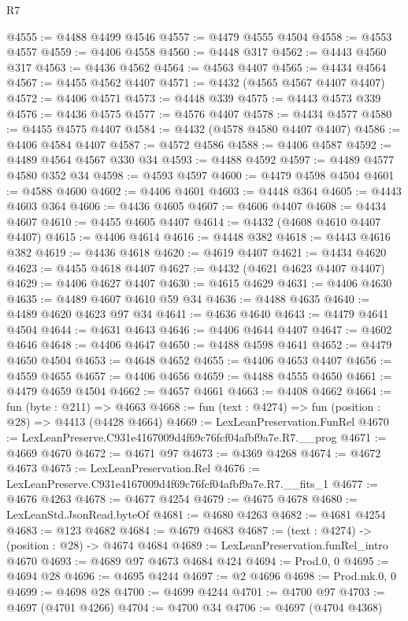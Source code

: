 \begin{lexlean}{R7}
\begin{coremodule}
@4555 := @4488 @4499 @4546
@4557 := @4479 @4555 @4504
@4558 := @4553 @4557
@4559 := @4406 @4558
@4560 := @4448 @317
@4562 := @4443 @4560 @317
@4563 := @4436 @4562
@4564 := @4563 @4407
@4565 := @4434 @4564
@4567 := @4455 @4562 @4407
@4571 := @4432 (@4565 @4567 @4407 @4407)
@4572 := @4406 @4571
@4573 := @4448 @339
@4575 := @4443 @4573 @339
@4576 := @4436 @4575
@4577 := @4576 @4407
@4578 := @4434 @4577
@4580 := @4455 @4575 @4407
@4584 := @4432 (@4578 @4580 @4407 @4407)
@4586 := @4406 @4584 @4407
@4587 := @4572 @4586
@4588 := @4406 @4587
@4592 := @4489 @4564 @4567 @330 @34
@4593 := @4488 @4592
@4597 := @4489 @4577 @4580 @352 @34
@4598 := @4593 @4597
@4600 := @4479 @4598 @4504
@4601 := @4588 @4600
@4602 := @4406 @4601
@4603 := @4448 @364
@4605 := @4443 @4603 @364
@4606 := @4436 @4605
@4607 := @4606 @4407
@4608 := @4434 @4607
@4610 := @4455 @4605 @4407
@4614 := @4432 (@4608 @4610 @4407 @4407)
@4615 := @4406 @4614
@4616 := @4448 @382
@4618 := @4443 @4616 @382
@4619 := @4436 @4618
@4620 := @4619 @4407
@4621 := @4434 @4620
@4623 := @4455 @4618 @4407
@4627 := @4432 (@4621 @4623 @4407 @4407)
@4629 := @4406 @4627 @4407
@4630 := @4615 @4629
@4631 := @4406 @4630
@4635 := @4489 @4607 @4610 @59 @34
@4636 := @4488 @4635
@4640 := @4489 @4620 @4623 @97 @34
@4641 := @4636 @4640
@4643 := @4479 @4641 @4504
@4644 := @4631 @4643
@4646 := @4406 @4644 @4407
@4647 := @4602 @4646
@4648 := @4406 @4647
@4650 := @4488 @4598 @4641
@4652 := @4479 @4650 @4504
@4653 := @4648 @4652
@4655 := @4406 @4653 @4407
@4656 := @4559 @4655
@4657 := @4406 @4656
@4659 := @4488 @4555 @4650
@4661 := @4479 @4659 @4504
@4662 := @4657 @4661
@4663 := @4408 @4662
@4664 := fun (byte : @211) => @4663
@4668 := fun (text : @4274) => fun (position : @28) => @4413 (@4428 @4664)
@4669 := LexLeanPreservation.FunRel
@4670 := LexLeanPreserve.C931e4167009d4f69c76fcf04afbf9a7e.R7.__prog
@4671 := @4669 @4670
@4672 := @4671 @97
@4673 := @4369 @4268
@4674 := @4672 @4673
@4675 := LexLeanPreservation.Rel
@4676 := LexLeanPreserve.C931e4167009d4f69c76fcf04afbf9a7e.R7.__fits_1
@4677 := @4676 @4263
@4678 := @4677 @4254
@4679 := @4675 @4678
@4680 := LexLeanStd.JsonRead.byteOf
@4681 := @4680 @4263
@4682 := @4681 @4254
@4683 := @123 @4682
@4684 := @4679 @4683
@4687 := (text : @4274) -> (position : @28) -> @4674 @4684
@4689 := LexLeanPreservation.funRel_intro @4670
@4693 := @4689 @97 @4673 @4684 @424
@4694 := Prod.{0, 0}
@4695 := @4694 @28
@4696 := @4695 @4244
@4697 := @2 @4696
@4698 := Prod.mk.{0, 0}
@4699 := @4698 @28
@4700 := @4699 @4244
@4701 := @4700 @97
@4703 := @4697 (@4701 @4266)
@4704 := @4700 @34
@4706 := @4697 (@4704 @4368)

\end{coremodule}
\end{lexlean}
